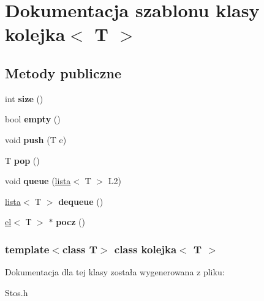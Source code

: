 \hypertarget{classkolejka}{\section{\-Dokumentacja szablonu klasy kolejka$<$ \-T $>$}
\label{classkolejka}
}
\subsection*{\-Metody publiczne}
\begin{DoxyCompactItemize}
\item 
\hypertarget{classkolejka_a97c873e61c9d08a08ddec5c0a784aaec}{int {\bfseries size} ()}\label{classkolejka_a97c873e61c9d08a08ddec5c0a784aaec}

\item 
\hypertarget{classkolejka_a2a5984247b91f8d4b96c1104755c14ee}{bool {\bfseries empty} ()}\label{classkolejka_a2a5984247b91f8d4b96c1104755c14ee}

\item 
\hypertarget{classkolejka_a9ab5091d52ebfe6cb4785bfd4ec2a0b9}{void {\bfseries push} (\-T e)}\label{classkolejka_a9ab5091d52ebfe6cb4785bfd4ec2a0b9}

\item 
\hypertarget{classkolejka_aed8feb84d0962f52961325340bd6ee92}{\-T {\bfseries pop} ()}\label{classkolejka_aed8feb84d0962f52961325340bd6ee92}

\item 
\hypertarget{classkolejka_a3802e595aad03b06e547714f5aa73a1d}{void {\bfseries queue} (\hyperlink{classlista}{lista}$<$ \-T $>$ \-L2)}\label{classkolejka_a3802e595aad03b06e547714f5aa73a1d}

\item 
\hypertarget{classkolejka_a88cae02e37f9f6a7891c45f6490de6d6}{\hyperlink{classlista}{lista}$<$ \-T $>$ {\bfseries dequeue} ()}\label{classkolejka_a88cae02e37f9f6a7891c45f6490de6d6}

\item 
\hypertarget{classkolejka_a662375b176addc87e5b6b91f1555ad09}{\hyperlink{classel}{el}$<$ \-T $>$ $\ast$ {\bfseries pocz} ()}\label{classkolejka_a662375b176addc87e5b6b91f1555ad09}

\end{DoxyCompactItemize}
\subsubsection*{template$<$class T$>$ class kolejka$<$ T $>$}



\-Dokumentacja dla tej klasy została wygenerowana z pliku\-:\begin{DoxyCompactItemize}
\item 
\-Stos.\-h\end{DoxyCompactItemize}
